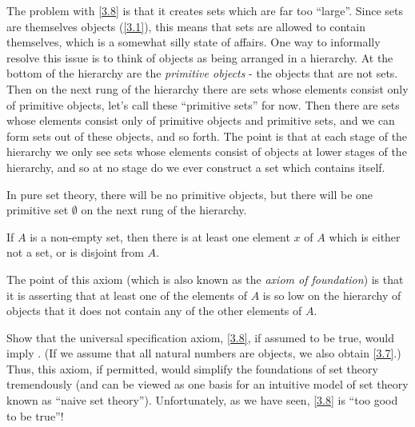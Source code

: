 \begin{note}
  The problem with \cref{3.8} is that it creates sets which are far too ``large''.
  Since sets are themselves objects (\cref{3.1}), this means that sets are allowed to contain themselves, which is a somewhat silly state of affairs.
  One way to informally resolve this issue is to think of objects as being arranged in a hierarchy.
  At the bottom of the hierarchy are the \emph{primitive objects} - the objects that are not sets.
  Then on the next rung of the hierarchy there are sets whose elements consist only of primitive objects, let's call these ``primitive sets'' for now.
  Then there are sets whose elements consist only of primitive objects and primitive sets, and we can form sets out of these objects, and so forth.
  The point is that at each stage of the hierarchy we only see sets whose elements consist of objects at lower stages of the hierarchy, and so at no stage do we ever construct a set which contains itself.
\end{note}

\begin{note}
  In pure set theory, there will be no primitive objects, but there will be one primitive set \(\emptyset\) on the next rung of the hierarchy.
\end{note}

\begin{ax}[Regularity]\label{3.9}
  If \(A\) is a non-empty set, then there is at least one element \(x\) of \(A\) which is either not a set, or is disjoint from \(A\).
\end{ax}

\begin{note}
  The point of this axiom (which is also known as the \emph{axiom of foundation}) is that it is asserting that at least one of the elements of \(A\) is so low on the hierarchy of objects that it does not contain any of the other elements of \(A\).
\end{note}

\exercisesection

\begin{ex}\label{ex:3.2.1}
  Show that the universal specification axiom, \cref{3.8}, if assumed to be true, would imply .
  (If we assume that all natural numbers are objects, we also obtain \cref{3.7}.)
  Thus, this axiom, if permitted, would simplify the foundations of set theory tremendously (and can be viewed as one basis for an intuitive model of set theory known as ``naive set theory'').
  Unfortunately, as we have seen, \cref{3.8} is ``too good to be true''!
\end{ex}


